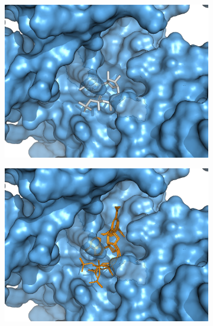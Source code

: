 \begin{figure}[h]
\begin{subfigure}[t]{0.34\textwidth}
	\end{subfigure}
	\vfill
	\begin{subfigure}[t]{0.4\textwidth}
		\caption{}\label{ch3fig:6c3p_bound}
		\centering
		\includegraphics[width=\textwidth]{6c3p_site_bound.png}
	\end{subfigure}
	\hfill
	\begin{subfigure}[t]{0.4\textwidth}
		\caption{}\label{ch3fig:6c3p_docked}
		\centering
		\includegraphics[width=\textwidth]{6c3p_site_docked.png}
	\end{subfigure}
	

\end{figure}
